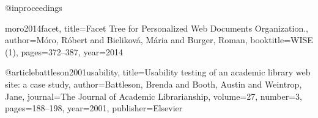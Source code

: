 @inproceedings{moro2014facet,
  title={Facet Tree for Personalized Web Documents Organization.},
  author={M{\'o}ro, R{\'o}bert and Bielikov{\'a}, M{\'a}ria and Burger, Roman},
  booktitle={WISE (1)},
  pages={372--387},
  year={2014}

@article{battleson2001usability,
  title={Usability testing of an academic library web site: a case study},
  author={Battleson, Brenda and Booth, Austin and Weintrop, Jane},
  journal={The Journal of Academic Librarianship},
  volume={27},
  number={3},
  pages={188--198},
  year={2001},
  publisher={Elsevier}
}
}